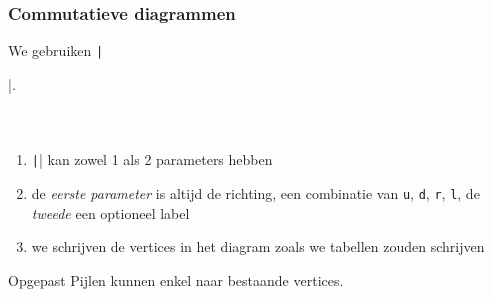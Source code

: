 \documentclass[]{beamer}
\begin{document}
\begin{frame}[fragile]
  \frametitle{Commutatieve diagrammen}

  We gebruiken \texttt|\usepackage{tikz-cd}|.

  \begin{columns}
    \begin{column}{.67\textwidth}
      \inputminted[fontsize = \scriptsize]{latex}{tikz/diagrams/1.tikz}
    \end{column}
    \begin{column}{.33\textwidth}
      
    \end{column}
  \end{columns}
  \begin{enumerate}
    \item\pause \texttt|\arrow| kan zowel 1 als 2 parameters hebben
    \item\pause de \emph{eerste parameter} is altijd de richting, een combinatie van \texttt{u}, \texttt{d}, \texttt{r}, \texttt{l}, de \emph{tweede} een optioneel label
    \item\pause we schrijven de vertices in het diagram zoals we tabellen zouden schrijven
  \end{enumerate}
  \begin{alertblock}{Opgepast}
    \dbend Pijlen kunnen enkel naar bestaande vertices.
  \end{alertblock}
\end{frame}
\end{document}
